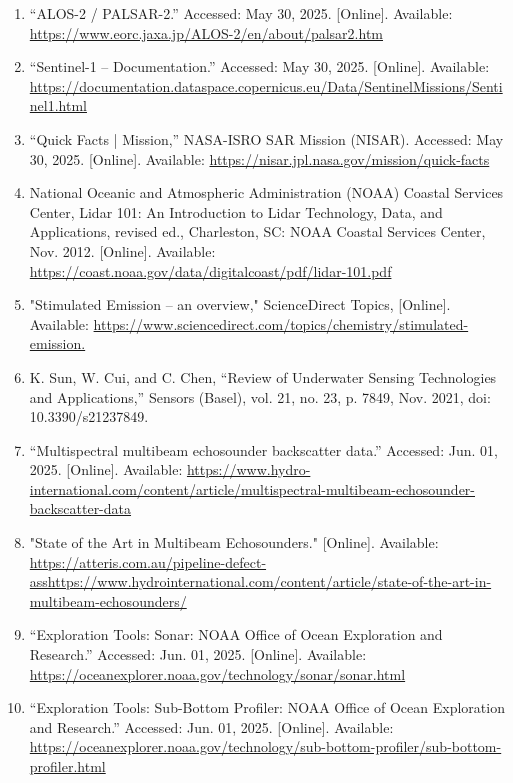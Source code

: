 \documentclass{article}
\begin{document}
\begin{sloppypar}
\begin{enumerate}
    \item{“ALOS-2 / PALSAR-2.” Accessed: May 30, 2025. [Online]. Available: \url{https://www.eorc.jaxa.jp/ALOS-2/en/about/palsar2.htm}}

    \item{“Sentinel-1 – Documentation.” Accessed: May 30, 2025. [Online]. Available: \url{https://documentation.dataspace.copernicus.eu/Data/SentinelMissions/Sentinel1.html}}

    \item{“Quick Facts | Mission,” NASA-ISRO SAR Mission (NISAR). Accessed: May 30, 2025. [Online]. Available: \url{https://nisar.jpl.nasa.gov/mission/quick-facts}}

    \item {National Oceanic and Atmospheric Administration (NOAA) Coastal Services Center, Lidar 101: An Introduction to Lidar Technology, Data, and Applications, revised ed., Charleston, SC: NOAA Coastal Services Center, Nov. 2012. [Online]. Available: \url{https://coast.noaa.gov/data/digitalcoast/pdf/lidar-101.pdf}}

    \item{"Stimulated Emission – an overview," ScienceDirect Topics, [Online]. Available: \url{https://www.sciencedirect.com/topics/chemistry/stimulated-emission.}}

    \item{K. Sun, W. Cui, and C. Chen, “Review of Underwater Sensing Technologies and Applications,” Sensors (Basel), vol. 21, no. 23, p. 7849, Nov. 2021, doi: 10.3390/s21237849.}

    \item{“Multispectral multibeam echosounder backscatter data.” Accessed: Jun. 01, 2025. [Online]. Available: \url{https://www.hydro-international.com/content/article/multispectral-multibeam-echosounder-backscatter-data}}

    \item{"State of the Art in Multibeam Echosounders." [Online]. Available: \url{https://atteris.com.au/pipeline-defect-asshttps://www.hydrointernational.com/content/article/state-of-the-art-in-multibeam-echosounders/}}

    \item{“Exploration Tools: Sonar: NOAA Office of Ocean Exploration and Research.” Accessed: Jun. 01, 2025. [Online]. Available: \url{https://oceanexplorer.noaa.gov/technology/sonar/sonar.html}}

    \item{“Exploration Tools: Sub-Bottom Profiler: NOAA Office of Ocean Exploration and Research.” Accessed: Jun. 01, 2025. [Online]. Available: \url{https://oceanexplorer.noaa.gov/technology/sub-bottom-profiler/sub-bottom-profiler.html}}



\end{enumerate}
\end{sloppypar}
\end{document}

